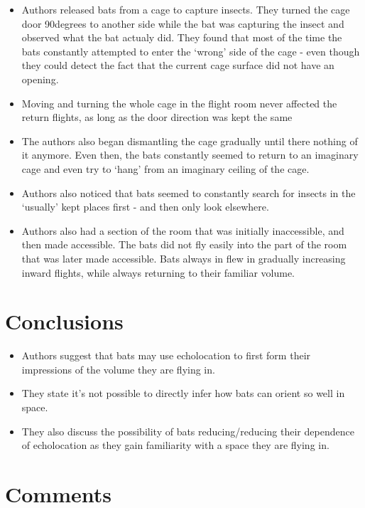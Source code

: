 \documentclass[
]{book}
\providecommand{\tightlist}{%
  \setlength{\itemsep}{0pt}\setlength{\parskip}{0pt}}
\begin{document}
\begin{itemize}
\item
  Authors released bats from a cage to capture insects. They turned the cage door 90degrees to another side while the bat was capturing the insect and observed what the bat actualy did. They found that most of the time the bats constantly attempted to enter the `wrong' side of the cage - even though they could detect the fact that the current cage surface did not have an opening.
\item
  Moving and turning the whole cage in the flight room never affected the return flights, as long as the door direction was kept the same
\item
  The authors also began dismantling the cage gradually until there nothing of it anymore. Even then, the bats constantly seemed to return to an imaginary cage and even try to `hang' from an imaginary ceiling of the cage.
\item
  Authors also noticed that bats seemed to constantly search for insects in the `usually' kept places first - and then only look elsewhere.
\item
  Authors also had a section of the room that was initially inaccessible, and then made accessible. The bats did not fly easily into the part of the room that was later made accessible. Bats always in flew in gradually increasing inward flights, while always returning to their familiar volume.
\end{itemize}

\hypertarget{conclusions}{%
\section{Conclusions}\label{conclusions}}

\begin{itemize}
\tightlist
\item
  Authors suggest that bats may use echolocation to first form their impressions of the volume they are flying in.
\item
  They state it's not possible to directly infer how bats can orient so well in space.
\item
  They also discuss the possibility of bats reducing/reducing their dependence of echolocation as they gain familiarity with a space they are flying in.
\end{itemize}

\hypertarget{comments-11}{%
\section{Comments}\label{comments-11}}
\end{document}
